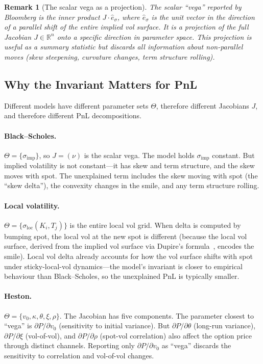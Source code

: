 \documentclass[11pt,a4paper]{article}
\newtheorem{remark}[definition]{Remark}
\begin{document}
\begin{remark}[The scalar vega as a projection]
\label{rem:vega-projection}
The scalar ``vega'' reported by Bloomberg is the inner product $J \cdot \hat{e}_{\sigma}$, where $\hat{e}_{\sigma}$ is the unit vector in the direction of a parallel shift of the entire implied vol surface.  It is a projection of the full Jacobian $J \in \mathbb{R}^n$ onto a specific direction in parameter space.  This projection is useful as a summary statistic but discards all information about non-parallel moves (skew steepening, curvature changes, term structure rolling).
\end{remark}

\subsection{Why the Invariant Matters for PnL}
\label{sec:invariant-pnl}

Different models have different parameter sets $\Theta$, therefore different Jacobians $J$, and therefore different PnL decompositions.

\paragraph{Black--Scholes.}  $\Theta = \{\sigma_{\mathrm{imp}}\}$, so $J = (\nu)$ is the scalar vega.  The model holds $\sigma_{\mathrm{imp}}$ constant.  But implied volatility is not constant---it has skew and term structure, and the skew moves with spot.  The unexplained term includes the skew moving with spot (the ``skew delta''), the convexity changes in the smile, and any term structure rolling.

\paragraph{Local volatility.}  $\Theta = \{\sigma_{\mathrm{loc}}(K_i, T_j)\}$ is the entire local vol grid.  When delta is computed by bumping spot, the local vol at the new spot is different (because the local vol surface, derived from the implied vol surface via Dupire's formula~\cite{loc_vol,implied_local_vol}, encodes the smile).  Local vol delta already accounts for how the vol surface shifts with spot under sticky-local-vol dynamics---the model's invariant is closer to empirical behaviour than Black--Scholes, so the unexplained PnL is typically smaller.

\paragraph{Heston.}  $\Theta = \{v_0, \kappa, \theta, \xi, \rho\}$.  The Jacobian has five components.  The parameter closest to ``vega'' is $\partial P / \partial v_0$ (sensitivity to initial variance).  But $\partial P / \partial \theta$ (long-run variance), $\partial P / \partial \xi$ (vol-of-vol), and $\partial P / \partial \rho$ (spot-vol correlation) also affect the option price through distinct channels.  Reporting only $\partial P / \partial v_0$ as ``vega'' discards the sensitivity to correlation and vol-of-vol changes.
\end{document}
